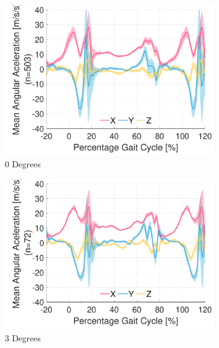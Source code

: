 \begin{figure}[!p]
    \centering
    \begin{subfigure}[b]{0.3\textwidth}
        \includegraphics[width=\textwidth]{content/3-Methods/ramp/ch3_ramp_0_degree_activity_walking_accel_r_ankle.pdf}
        \caption{0 Degrees}
    \end{subfigure}
    \begin{subfigure}[b]{0.3\textwidth}
        \includegraphics[width=\textwidth]{content/3-Methods/ramp/ch3_ramp_3_degree_activity_ramp_up_accel_r_ankle.pdf}
        \caption{3 Degrees}
    \end{subfigure}
    \begin{subfigure}[b]{0.3\textwidth}

\end{subfigure}
\end{figure}
